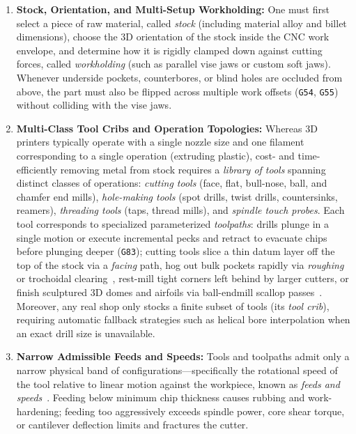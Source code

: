\documentclass[conference]{IEEEtran}
\begin{document}
\begin{enumerate}
  \item \textbf{Stock, Orientation, and Multi-Setup Workholding:} One must first select a piece of raw material, called \emph{stock} (including material alloy and billet dimensions), choose the 3D orientation of the stock inside the CNC work envelope, and determine how it is rigidly clamped down against cutting forces, called \emph{workholding} (such as parallel vise jaws or custom soft jaws). Whenever underside pockets, counterbores, or blind holes are occluded from above, the part must also be flipped across multiple work offsets (\texttt{G54}, \texttt{G55}) without colliding with the vise jaws.
  \item \textbf{Multi-Class Tool Cribs and Operation Topologies:} Whereas 3D printers typically operate with a single nozzle size and one filament corresponding to a single operation (extruding plastic), cost- and time-efficiently removing metal from stock requires a \emph{library of tools} spanning distinct classes of operations: \emph{cutting tools} (face, flat, bull-nose, ball, and chamfer end mills), \emph{hole-making tools} (spot drills, twist drills, countersinks, reamers), \emph{threading tools} (taps, thread mills), and \emph{spindle touch probes}. Each tool corresponds to specialized parameterized \emph{toolpaths}: drills plunge in a single motion or execute incremental pecks and retract to evacuate chips before plunging deeper (\texttt{G83}); cutting tools slice a thin datum layer off the top of the stock via a \emph{facing} path, hog out bulk pockets rapidly via \emph{roughing} or trochoidal clearing~\cite{held1991pocket,rauch2009trochoidal}, rest-mill tight corners left behind by larger cutters, or finish sculptured 3D domes and airfoils via ball-endmill scallop passes~\cite{choi1998sculptured}. Moreover, any real shop only stocks a finite subset of tools (its \emph{tool crib}), requiring automatic fallback strategies such as helical bore interpolation when an exact drill size is unavailable.
  \item \textbf{Narrow Admissible Feeds and Speeds:} Tools and toolpaths admit only a narrow physical band of configurations—specifically the rotational speed of the tool relative to linear motion against the workpiece, known as \emph{feeds and speeds}~\cite{martellotti1941milling,altintas2012manufacturing}. Feeding below minimum chip thickness causes rubbing and work-hardening; feeding too aggressively exceeds spindle power, core shear torque, or cantilever deflection limits and fractures the cutter.
\end{enumerate}
\end{document}
